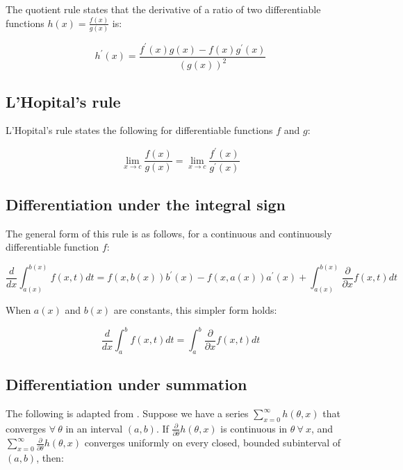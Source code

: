 \documentclass{report}
\begin{document}
The quotient rule states that the derivative of a ratio of two differentiable functions $h(x) = \frac{f(x)}{g(x)}$ is:

\begin{equation}\label{eq:quotient-rule}
    h^\prime(x) = \frac{f^\prime(x)g(x) - f(x)g^\prime(x)}{\left(g(x)\right)^2}
\end{equation}

\subsection{L'Hopital's rule}

L'Hopital's rule states the following for differentiable functions $f$ and $g$:

\begin{equation}\label{eq:lhopitals-rule}
    \lim_{x\to c} \frac{f(x)}{g(x)} = \lim_{x\to c} \frac{f^\prime(x)}{g^\prime(x)}
\end{equation}

\subsection{Differentiation under the integral sign}

The general form of this rule is as follows, for a continuous and continuously differentiable function $f$:

\begin{equation}\label{eq:diff-under-integral-general}
    \frac{d}{dx} \int_{a(x)}^{b(x)} f(x, t) dt = f(x, b(x))b^\prime(x) - f(x, a(x))a^\prime(x) + \int_{a(x)}^{b(x)} \frac{\partial}{\partial x} f(x, t) dt
\end{equation}

When $a(x)$ and $b(x)$ are constants, this simpler form holds:

\begin{equation}\label{eq:diff-under-integral-simple}
    \frac{d}{dx} \int_a^b f(x, t) dt = \int_a^b \frac{\partial}{\partial x} f(x, t) dt
\end{equation}

\subsection{Differentiation under summation}

The following is adapted from \cite[Chapter~2.4]{casella_statistical_2002}. Suppose we have a series $\sum_{x=0}^\infty h(\theta, x)$ that converges $\forall \: \theta$ in an interval $(a, b)$. If $\frac{\partial}{\partial\theta} h(\theta, x)$ is continuous in $\theta \: \forall \: x$, and $\sum_{x=0}^\infty \frac{\partial}{\partial\theta} h(\theta, x)$ converges uniformly on every closed, bounded subinterval of $(a, b)$, then:
\end{document}
